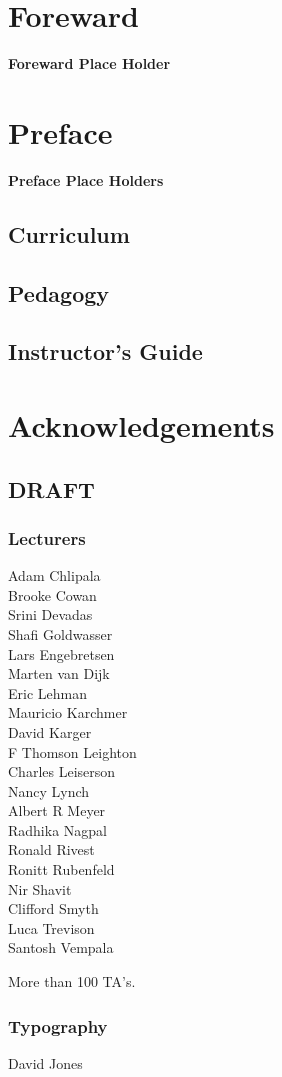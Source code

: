 \chapter*{Foreward}
\textbf{Foreward Place Holder}

\chapter*{Preface}

\textbf{Preface Place Holders}

\section*{Curriculum}

\section*{Pedagogy}

\section*{Instructor's Guide}

\chapter*{Acknowledgements}

\section*{DRAFT}

\subsection*{Lecturers}

Adam Chlipala\\
Brooke Cowan\\
Srini Devadas\\
Shafi Goldwasser\\
Lars Engebretsen\\
Marten van Dijk\\
Eric Lehman\\
Mauricio Karchmer\\
David Karger\\
F Thomson Leighton\\
Charles Leiserson\\
Nancy Lynch\\
Albert R Meyer\\
Radhika Nagpal\\
Ronald Rivest\\
Ronitt Rubenfeld\\
Nir Shavit\\
Clifford Smyth\\
Luca Trevison\\
Santosh Vempala

More than 100 TA's.

\subsection*{Typography}

David Jones\\

\endinput
